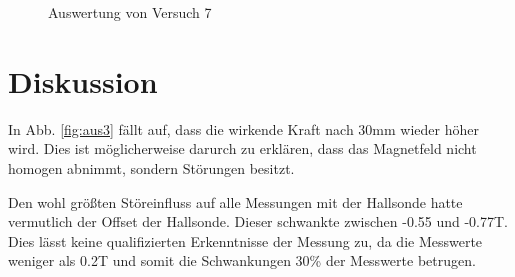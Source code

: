 \documentclass[12pt,a4paper,titlepage,headinclude,bibtotoc]{scrartcl}
\begin{document}
\begin{figure}[h]
\centering
{}
\caption{Auswertung von Versuch 7}
\label{fig:aus7}
\end{figure}

\section{Diskussion}
\label{sec:diskussion}
In Abb. \ref{fig:aus3} fällt auf, dass die wirkende Kraft nach 30mm wieder höher wird.
Dies ist möglicherweise darurch zu erklären, dass das Magnetfeld nicht homogen abnimmt, sondern Störungen besitzt.

Den wohl größten Störeinfluss auf alle Messungen mit der Hallsonde hatte vermutlich der Offset der Hallsonde.
Dieser schwankte zwischen -0.55 und -0.77T.
Dies lässt keine qualifizierten Erkenntnisse der Messung zu, da die Messwerte weniger als 0.2T und somit die Schwankungen 30\% der Messwerte betrugen.



\end{document}

